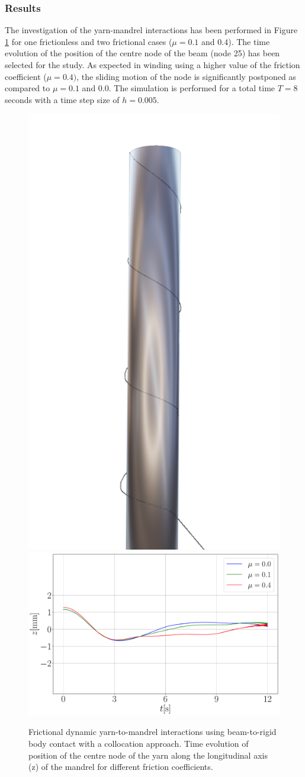 \subsubsection{Results}
The investigation of the yarn-mandrel interactions has been performed in Figure \ref{fig:fricvalues} for one frictionless and two frictional cases ($\mu = 0.1$ and $0.4$). The time evolution of the position of the centre node of the beam (node 25) has been selected for the study. As expected in winding using a higher value of the friction coefficient ($\mu = 0.4)$, the sliding motion of the node is significantly postponed as compared to $\mu = 0.1$ and $0.0$. The simulation is performed for a total time $T = 8$ seconds with a time step size of $h = 0.005$.

\begin{figure}[h]
\centering
  \centering
  \includegraphics[width=0.27\linewidth]{figures/steel_mandrel_1.png}\\
  \centering
  \includegraphics[width=0.47\linewidth]{figures/mu_compare.pdf}
\caption{Frictional dynamic yarn-to-mandrel interactions using beam-to-rigid body contact with a collocation approach. Time evolution of position of the centre node of the yarn along the longitudinal axis (z) of the mandrel for different friction coefficients.}
\label{fig:fricvalues}
\end{figure}



















